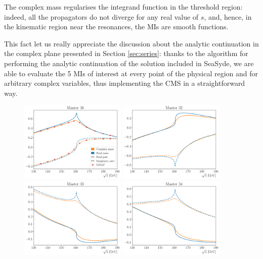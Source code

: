 The complex mass regularises the integrand function in the threshold region: indeed, all the propagators
\be
\ee
do not diverge for any real value of $s$, and, hence, in the kinematic region near the resonances, the MIs are smooth functions.

This fact let us really appreciate the discussion about the analytic continuation in the complex plane presented in Section \ref{sec:series}:
thanks to the algorithm for performing the analytic continuation of the solution included in {\sc SeaSyde}, we are able to evaluate the 5 MIs of interest at every point of the physical region and for arbitrary complex variables, thus implementing the CMS in a straightforward way.

\begin{figure}[ht!]
    \centering
    \includegraphics[width=0.45\textwidth]{paperSeaFire/Images/master10_legend.pdf}
    \includegraphics[width=0.45\textwidth]{paperSeaFire/Images/master32.pdf}
    \includegraphics[width=0.45\textwidth]{paperSeaFire/Images/master33.pdf}
    \includegraphics[width=0.45\textwidth]{paperSeaFire/Images/master34.pdf}

\end{figure}
